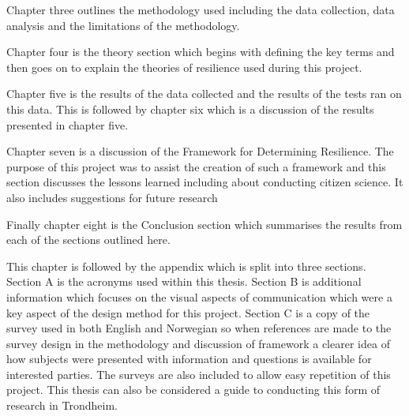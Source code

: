 Chapter three outlines the methodology used including the data collection, data analysis and the limitations of the methodology.

Chapter four is the theory section which begins with defining the key terms and then goes on to explain the theories of resilience used during this project.

Chapter five is the results of the data collected and the results of the tests ran on this data. This is followed by chapter six which is a discussion of the results presented in chapter five. 


Chapter seven is a discussion of the Framework for Determining Resilience. The purpose of this project was to assist the creation of such a framework and this section discusses the lessons learned including about conducting citizen science. It also includes suggestions for future research

Finally chapter eight is the Conclusion section which summarises the results from each of the sections outlined here.

This chapter is followed by the appendix which is split into three sections. Section A is the acronyms used within this thesis. Section B is additional information which focuses on the visual aspects of communication which were a key aspect of the design method for this project. Section C is a copy of the survey used in both English and Norwegian so when references are made to the survey design in the methodology and  discussion of framework a clearer idea of how subjects were presented with information and questions is available for interested parties. The surveys are also included to allow easy repetition of this project. This thesis can also be considered a guide to conducting this form of research in Trondheim. 
